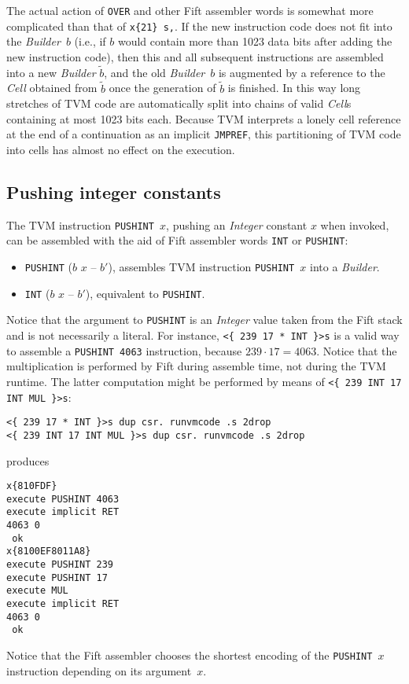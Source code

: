 \documentclass[12pt,oneside]{article}
\def\mysubsection#1{\subsection{#1}\fancyhead[C]{\small{\textsc{\textrm{\thesubsection.} #1}}}}
\begin{document}
The actual action of {\tt OVER} and other Fift assembler words is somewhat more complicated than that of {\tt x\{21\} s,}. If the new instruction code does not fit into the {\em Builder}~$b$ (i.e., if $b$ would contain more than 1023 data bits after adding the new instruction code), then this and all subsequent instructions are assembled into a new {\em Builder\/} $\tilde b$, and the old {\em Builder}~$b$ is augmented by a reference to the {\em Cell\/} obtained from $\tilde b$ once the generation of $\tilde b$ is finished. In this way long stretches of TVM code are automatically split into chains of valid {\em Cell\/}s containing at most 1023 bits each. Because TVM interprets a lonely cell reference at the end of a continuation as an implicit {\tt JMPREF}, this partitioning of TVM code into cells has almost no effect on the execution.

\mysubsection{Pushing integer constants}
The TVM instruction {\tt PUSHINT $x$}, pushing an {\em Integer\/} constant $x$ when invoked, can be assembled with the aid of Fift assembler words {\tt INT} or {\tt PUSHINT}:
\begin{itemize}
\item {\tt PUSHINT} ($b$ $x$ -- $b'$), assembles TVM instruction {\tt PUSHINT $x$} into a {\em Builder}.
\item {\tt INT} ($b$ $x$ -- $b'$), equivalent to {\tt PUSHINT}.
\end{itemize}
Notice that the argument to {\tt PUSHINT} is an {\em Integer\/} value taken from the Fift stack and is not necessarily a literal. For instance, {\tt <\{ 239 17 * INT \}>s} is a valid way to assemble a {\tt PUSHINT 4063} instruction, because $239\cdot17=4063$. Notice that the multiplication is performed by Fift during assemble time, not during the TVM runtime. The latter computation might be performed by means of {\tt <\{ 239 INT 17 INT MUL \}>s}:
\begin{verbatim}
<{ 239 17 * INT }>s dup csr. runvmcode .s 2drop
<{ 239 INT 17 INT MUL }>s dup csr. runvmcode .s 2drop
\end{verbatim}
produces
\begin{verbatim}
x{810FDF}
execute PUSHINT 4063
execute implicit RET
4063 0
 ok
x{8100EF8011A8}
execute PUSHINT 239
execute PUSHINT 17
execute MUL
execute implicit RET
4063 0
 ok
\end{verbatim}
Notice that the Fift assembler chooses the shortest encoding of the {\tt PUSHINT}~$x$ instruction depending on its argument~$x$.
\end{document}

